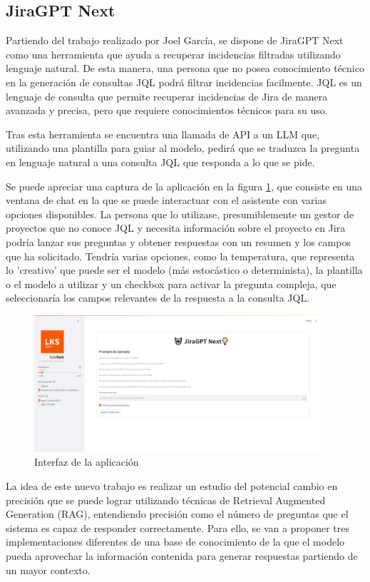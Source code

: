 \subsection{JiraGPT Next}
Partiendo del trabajo realizado por Joel García, se dispone de JiraGPT Next como una herramienta que ayuda a recuperar incidencias filtradas utilizando lenguaje natural. De esta manera, una persona que no posea conocimiento técnico en la generación de consultas JQL podrá filtrar incidencias facilmente. JQL es un lenguaje de consulta que permite recuperar incidencias de Jira de manera avanzada y precisa, pero que requiere conocimientos técnicos para su uso. 

Tras esta herramienta se encuentra una llamada de API a un LLM que, utilizando una plantilla para guiar al modelo, pedirá que se traduzca la pregunta en lenguaje natural a una consulta JQL que responda a lo que se pide.

Se puede apreciar una captura de la aplicación en la figura \ref{fig:estado_inicial}, que consiste en una ventana de chat en la que se puede interactuar con el asistente con varias opciones disponibles. La persona que lo utilizase, presumiblemente un gestor de proyectos que no conoce JQL y necesita información sobre el proyecto en Jira podría lanzar sus preguntas y obtener respuestas con un resumen y los campos que ha solicitado. Tendría varias opciones, como la temperatura, que representa lo 'creativo' que puede ser el modelo (más estocástico o determinista), la plantilla o el modelo a utilizar y un checkbox para activar la pregunta compleja, que seleccionaría los campos relevantes de la respuesta a la consulta JQL.

\begin{figure}[H]
    \centering
    \includegraphics[width=0.95\textwidth]{images/Streamlit_inicial.png}
    \caption{Interfaz de la aplicación}\label{fig:estado_inicial}
\end{figure}

La idea de este nuevo trabajo es realizar un estudio del potencial cambio en precisión que se puede lograr utilizando técnicas de Retrieval Augmented Generation (RAG), entendiendo precisión como el número de preguntas que el sistema es capaz de responder correctamente. Para ello, se van a proponer tres implementaciones diferentes de una base de conocimiento de la que el modelo pueda aprovechar la información contenida para generar respuestas partiendo de un mayor contexto. 

